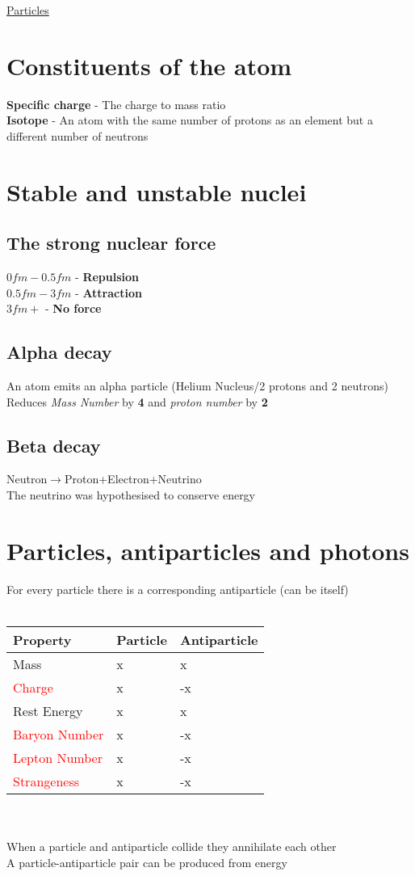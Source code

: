 \documentclass{article}[18pt]
\begin{document}
\begin{center}
\underline{\huge Particles}
\end{center}
\section{Constituents of the atom}
\textbf{Specific charge} - The charge to mass ratio\\
\textbf{Isotope} - An atom with the same number of protons as an element but a different number of neutrons
\section{Stable and unstable nuclei}
\subsection{The strong nuclear force}
$0fm-0.5fm$ - \textbf{Repulsion}\\
$0.5fm-3fm$ - \textbf{Attraction}\\
$3fm+$ - \textbf{No force}
\subsection{Alpha decay}
An atom emits an alpha particle (Helium Nucleus/2 protons and 2 neutrons)\\
Reduces \textit{Mass Number} by \textbf{4} and \textit{proton number} by \textbf{2}
\subsection{Beta decay}
Neutron$\rightarrow$Proton+Electron+Neutrino\\
The neutrino was hypothesised to conserve energy
\section{Particles, antiparticles and photons}
For every particle there is a corresponding antiparticle (can be itself)\\
\\
{\def\arraystretch{1.5}
\begin{tabularx}{\textwidth}{|X|X|X|}
\hline
\textbf{Property}&\textbf{Particle}&\textbf{Antiparticle}\\
\hline
Mass&x&x\\
\hline
\textcolor{red}{Charge}&x&-x\\
\hline
Rest Energy&x&x\\
\hline
\textcolor{red}{Baryon Number}&x&-x\\
\hline
\textcolor{red}{Lepton Number}&x&-x\\
\hline
\textcolor{red}{Strangeness}&x&-x\\
\hline
\end{tabularx}}
\\
\\
When a particle and antiparticle collide they annihilate each other\\
A particle-antiparticle pair can be produced from energy
\end{document}
